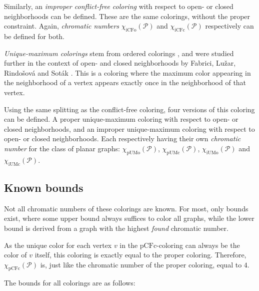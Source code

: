\documentclass{article}
\begin{document}
Similarly, an \textit{improper conflict-free coloring} with respect to open- or closed neighborhoods can be defined. These are the same colorings, without the proper constraint. Again, \textit{chromatic numbers} $\chi_{\mathrm{iCFo}}(\mathcal{P})$ and $\chi_{\mathrm{iCFc}}(\mathcal{P})$ respectively can be defined for both.

\textit{Unique-maximum colorings} stem from ordered colorings \cite{KATCHALSKI1995141}, and were studied further in the context of open- and closed neighborhoods by Fabrici, Lužar, Rindošová and Soták \cite{fabrici2023proper}. This is a coloring where the maximum color appearing in the neighborhood of a vertex appears exactly once in the neighborhood of that vertex.

Using the same splitting as the conflict-free coloring, four versions of this coloring can be defined. A proper unique-maximum coloring with respect to open- or closed neighborhoods, and an improper unique-maximum coloring with respect to open- or closed neighborhoods. Each respectively having their own \textit{chromatic number} for the class of planar graphs: $\chi_{\mathrm{pUMo}}(\mathcal{P})$, $\chi_{\mathrm{pUMc}}(\mathcal{P})$, $\chi_{\mathrm{iUMo}}(\mathcal{P})$ and $\chi_{\mathrm{iUMc}}(\mathcal{P})$.

\subsection{Known bounds}

Not all chromatic numbers of these colorings are known. For most, only bounds exist, where some upper bound always suffices to color all graphs, while the lower bound is derived from a graph with the highest \textit{found} chromatic number. 

As the unique color for each vertex $v$ in the $\mathrm{pCFc}$-coloring can always be the color of $v$ itself, this coloring is exactly equal to the proper coloring. Therefore, $\chi_{\mathrm{pCFc}}(\mathcal{P})$ is, just like the chromatic number of the proper coloring, equal to $4$.

The bounds for all colorings are as follows:
\end{document}

